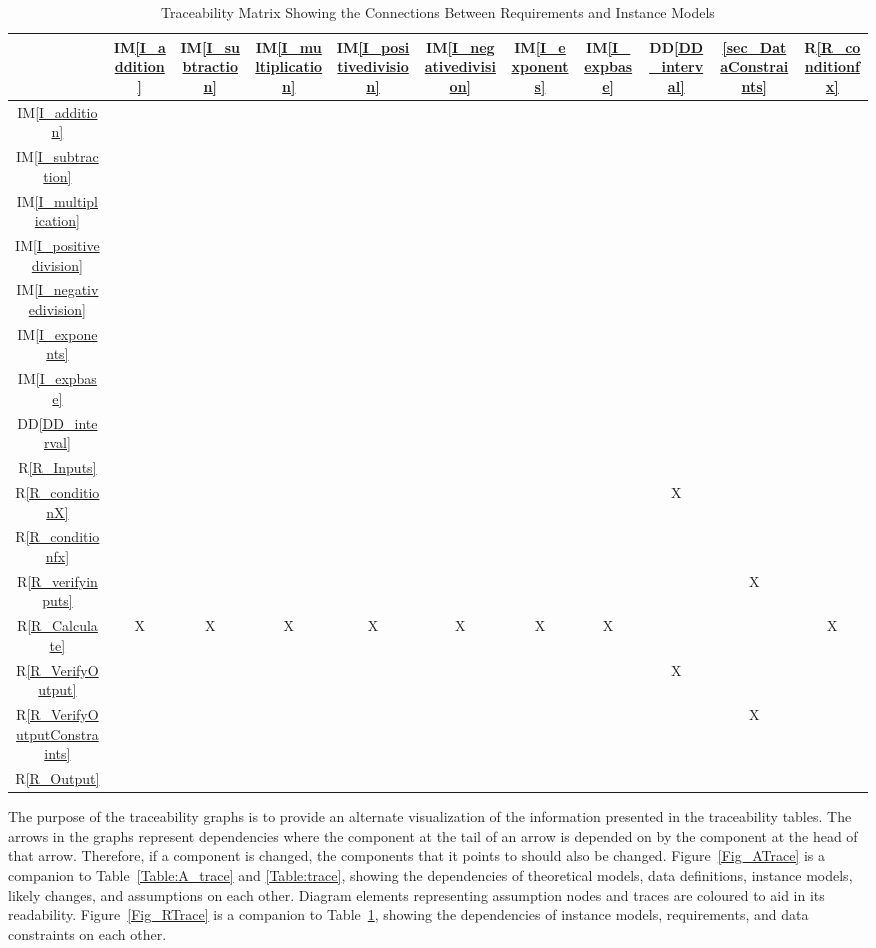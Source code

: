 \documentclass[12pt]{article}
\newcommand{\ddref}[1]{DD\ref{#1}}
\newcommand{\iref}[1]{IM\ref{#1}}
\newcommand{\rref}[1]{R\ref{#1}}
\begin{document}
\begin{table}[H]
	\centering
	\begin{tabular}{|c|c|c|c|c|c|c|c|c|c|c|}
		\hline
		& \iref{I_addition}& \iref{I_subtraction}& \iref{I_multiplication}& 
		\iref{I_positivedivision}& \iref{I_negativedivision}& 
		\iref{I_exponents}& 
		\iref{I_expbase}& \ddref{DD_interval}& \ref{sec_DataConstraints}& 
		\rref{R_conditionfx} \\
		\hline
		\iref{I_addition}            & & & & & & & &&& \\ \hline
		\iref{I_subtraction}            & & & & & & &  &&&\\ \hline
		\iref{I_multiplication}          & & & & & & &  &&&\\ \hline
		\iref{I_positivedivision}          & & & & & & & &&& \\ \hline
		\iref{I_negativedivision}     & & & & & & & &&&\\ \hline
		\iref{I_exponents}    & & & & & & & &&&\\ \hline
		\iref{I_expbase}   & & & & & & & &&&\\ \hline
		\ddref{DD_interval}   & & & & & & & &&&\\ \hline
		\rref{R_Inputs}  & & & & & & &  &&&\\ \hline
		\rref{R_conditionX}     & & & & & & & &X&&\\ \hline 
		\rref{R_conditionfx}       & & & & & & & &&&\\ \hline
		\rref{R_verifyinputs}   & & & & & & & &&X&\\ \hline
		\rref{R_Calculate}     & X&X &X &X &X &X &X &&&X\\ \hline
		\rref{R_VerifyOutput}  & & & & & & & &X&&\\ \hline
		\rref{R_VerifyOutputConstraints} & & & & & & & &&X&\\ \hline
		\rref{R_Output}   & & & & & & & &&&\\ 
		\hline
	\end{tabular}
	\caption{Traceability Matrix Showing the Connections Between Requirements 
	and Instance Models}
	\label{Table:R_trace}
\end{table}

The purpose of the traceability graphs is to provide an alternate visualization 
of the information presented in the traceability tables. The arrows in the 
graphs represent dependencies where the component at the tail of an arrow is 
depended on by the component at the head of that arrow. Therefore, if a 
component is changed, the components that it points to should also be
changed. Figure~\ref{Fig_ATrace} is a companion to Table~\ref{Table:A_trace} 
and \ref{Table:trace}, showing the dependencies of theoretical models, data 
definitions, instance models, likely changes, and assumptions on each other. 
Diagram elements representing assumption nodes and traces are coloured to aid 
in its readability. Figure~\ref{Fig_RTrace} is a companion to 
Table~\ref{Table:R_trace}, showing the dependencies of instance models, 
requirements, and data constraints on each other.
\end{document}
